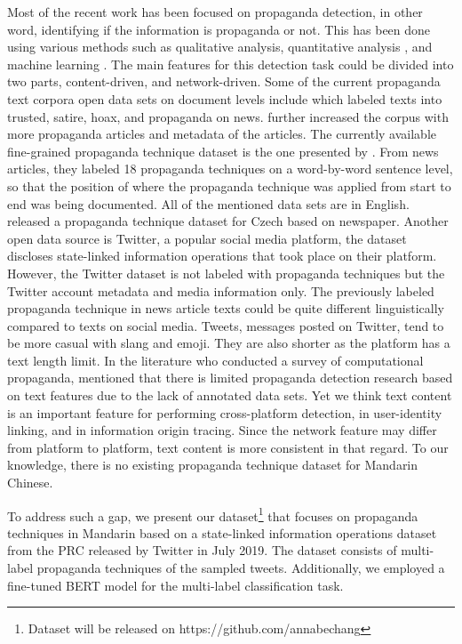\documentclass[sigconf]{acmart}
\begin{document}
Most of the recent work has been focused on propaganda detection, in other word, identifying if the information is propaganda or not. This has been done using various methods such as qualitative analysis, quantitative analysis \cite{beskow2020characterization}, and machine learning \cite{wickramarathna2020framework} \cite{rcc}. The main features for this detection task could be divided into two parts, content-driven, and network-driven. 
Some of the current propaganda text corpora open data sets on document levels include \citet{rashkin2017truth} which labeled texts into trusted, satire, hoax, and propaganda on news. \citet{barron2019proppy} further increased the corpus \cite{rashkin2017truth} with more propaganda articles and metadata of the articles. The currently available fine-grained propaganda technique dataset is the one presented by \citet{da2019fine}. From news articles, they labeled 18 propaganda techniques on a word-by-word sentence level, so that the position of where the propaganda technique was applied from start to end was being documented. All of the mentioned data sets are in English. \citet{baisa2019benchmark} released a propaganda technique dataset for Czech based on newspaper. 
 Another open data source is Twitter, a popular social media platform, the dataset discloses state-linked information operations that took place on their platform. 
 However, the Twitter dataset is not labeled with propaganda techniques but the Twitter account metadata and media information only. The previously labeled propaganda technique in news article texts could be quite different linguistically compared to texts on social media. Tweets, messages posted on Twitter, tend to be more casual with slang and emoji. They are also shorter as the platform has a text length limit.
In the literature \citet{da2020survey} who conducted a survey of computational propaganda, mentioned that there is limited propaganda detection research based on text features due to the lack of annotated data sets. Yet we think text content is an important feature for performing cross-platform detection, in user-identity linking, and in information origin tracing. Since the network feature may differ from platform to platform, text content is more consistent in that regard. To our knowledge, there is no existing propaganda technique dataset for Mandarin  Chinese.   

To address such a gap, we present our dataset\footnote{Dataset will be released on https://github.com/annabechang} that focuses on propaganda techniques in Mandarin based on a state-linked information operations dataset from the PRC released by Twitter in July 2019. The dataset consists of multi-label propaganda techniques of the sampled tweets. Additionally, we employed a fine-tuned BERT model for the multi-label classification task. 
\end{document}
